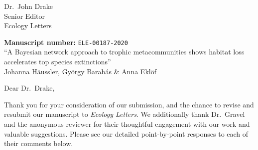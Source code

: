 \documentclass[11pt]{article}
\begin{document}
\begin{flushright}
  Dr.~John Drake\\
  Senior Editor\\
  Ecology Letters
\end{flushright}


\begin{flushleft}
\textbf{Manuscript number: } \texttt{ELE-00187-2020} \\
``A Bayesian network approach to trophic metacommunities shows habitat loss accelerates top species extinctions''\\
Johanna H\"aussler, Gy\"orgy Barab\'as \& Anna Eklöf
\end{flushleft}


Dear Dr.~Drake,

Thank you for your consideration of our submission, and the chance to revise and resubmit our manuscript to \textit{Ecology Letters}. We additionally thank Dr.~Gravel and the anonymous reviewer for their thoughtful engagement with our work and valuable suggestions. Please see our detailed point-by-point responses to each of their comments below.
\end{document}
